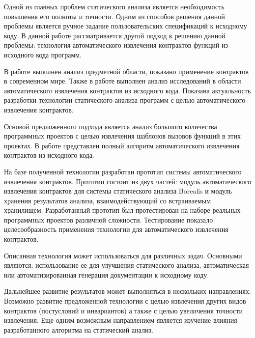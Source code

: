 \conclusion
Одной из главных проблем статического анализа является необходимость повышения его полноты и точности. Одним из способов решения данной проблемы является ручное задание пользовательских спецификаций к исходному коду. В данной работе рассматривается другой подход к решению данной проблемы: технология автоматического извлечения контрактов функций из исходного кода программ.

В работе выполнен анализ предметной области, показано применение контрактов в современном мире. Также в работе выполнен анализ исследований в области автоматического извлечения контрактов из исходного кода. Показана актуальность разработки технологии статического анализа программ с целью автоматического извлечения контрактов.

Основой предложенного подхода является анализ большого количества программных проектов с целью извлечения шаблонов вызовов функций в этих проектах. В работе представлен полный алгоритм автоматического извлечения контрактов из исходного кода.

На базе полученной технологии разработан прототип системы автоматического извлечения контрактов. Прототип состоит из двух частей: модуль автоматического извлечения контрактов для системы статического анализа Borealis и модуль хранения результатов анализа, взаимодействующий со встраиваемым хранилищем. Разработанный прототип был протестирован на наборе реальных программных проектов различной сложности. Тестирование показало целесообразность применения технологии для автоматического извлечения контрактов.

Описанная технология может использоваться для различных задач. Основными являются: использование ее для улучшения статического анализа, автоматическая или автоматизированная генерация документации к исходному коду.

Дальнейшее развитие результатов может выполняться в нескольких направлениях. Возможно развитие предложенной технологии с целью извлечения других видов контрактов (постусловий и инвариантов) а также с целью увеличения точности извлечения. Еще одним возможным направлением является изучение влияния разработанного алгоритма на статический анализ.